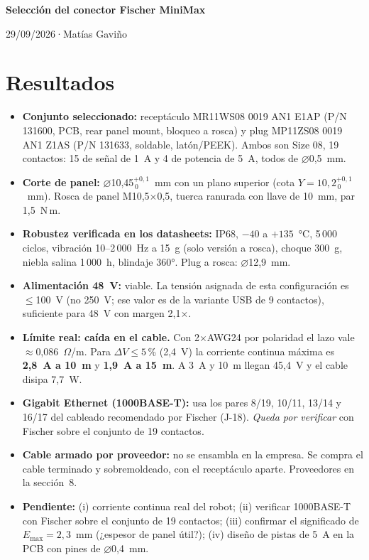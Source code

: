 \documentclass[11pt,a4paper]{article}
\newcommand{\titulo}{Selección del conector Fischer MiniMax}
\newcommand{\autor}{Matías Gaviño}
\newcommand{\fecha}{29/09/2026}                    %
\newcommand{\cabecera}{%
  \thispagestyle{fancy}%
  {\fontsize{20}{24}\selectfont\bfseries\titulo\par}%
  \vspace{5pt}%
  {\small\color{gris-medio}\fecha\quad·\quad\autor\par}%
  \vspace{6pt}}
\begin{document}
\cabecera

\section{Resultados}
\begin{itemize}
  \item \textbf{Conjunto seleccionado:} receptáculo MR11WS08 0019 AN1 E1AP (P/N 131600, PCB, rear panel mount, bloqueo a rosca) y plug MP11ZS08 0019 AN1 Z1AS (P/N 131633, soldable, latón/PEEK). Ambos son Size 08, 19 contactos: 15 de señal de 1~A y 4 de potencia de 5~A, todos de \ensuremath{\varnothing}0,5~mm.
  \item \textbf{Corte de panel:} \ensuremath{\varnothing}10,45$^{+0,1}_{\,0}$~mm con un plano superior (cota $Y=10{,}2^{+0,1}_{\,0}$~mm). Rosca de panel M10,5$\times$0,5, tuerca ranurada con llave de 10~mm, par 1,5~N\,m.
  \item \textbf{Robustez verificada en los datasheets:} IP68, $-40$ a $+135$~°C, 5\,000 ciclos, vibración 10--2\,000~Hz a 15~g (solo versión a rosca), choque 300~g, niebla salina 1\,000~h, blindaje 360°. Plug a rosca: \ensuremath{\varnothing}12,9~mm.
  \item \textbf{Alimentación 48~V:} viable. La tensión asignada de esta configuración es $\le$100~V (no 250~V; ese valor es de la variante USB de 9 contactos), suficiente para 48~V con margen 2,1$\times$.
  \item \textbf{Límite real: caída en el cable.} Con 2$\times$AWG24 por polaridad el lazo vale $\approx$0,086~$\Omega$/m. Para $\Delta V\le 5$\,\% (2,4~V) la corriente continua máxima es \textbf{2,8~A a 10~m} y \textbf{1,9~A a 15~m}. A 3~A y 10~m llegan 45,4~V y el cable disipa 7,7~W.
  \item \textbf{Gigabit Ethernet (1000BASE-T):} usa los pares 8/19, 10/11, 13/14 y 16/17 del cableado recomendado por Fischer (J-18). \emph{Queda por verificar} con Fischer sobre el conjunto de 19 contactos.
  \item \textbf{Cable armado por proveedor:} no se ensambla en la empresa. Se compra el cable terminado y sobremoldeado, con el receptáculo aparte. Proveedores en la sección~8.
  \item \textbf{Pendiente:} (i) corriente continua real del robot; (ii) verificar 1000BASE-T con Fischer sobre el conjunto de 19 contactos; (iii) confirmar el significado de $E_{\max}=2{,}3$~mm (¿espesor de panel útil?); (iv) diseño de pistas de 5~A en la PCB con pines de \ensuremath{\varnothing}0,4~mm.
\end{itemize}
\end{document}
